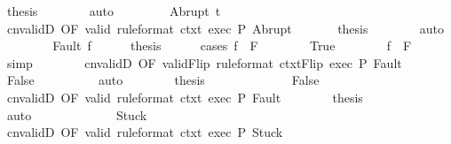 \begin{isabellebody}
\ {\isacharquery}thesis\isanewline
\ \ \ \ \ \ \isamarkupfalse%
\ auto\isanewline
\ \ \isamarkupfalse%
\isanewline
\ \ \ \ \isamarkupfalse%
\ {\isacharparenleft}Abrupt\ t{\isacharprime}{\isacharparenright}\isanewline
\ \ \ \ \isamarkupfalse%
\ cnvalidD\ {\isacharbrackleft}OF\ valid\ {\isacharbrackleft}rule{\isacharunderscore}format{\isacharbrackright}\ ctxt{\isacharprime}\ exec\ P{\isacharbrackright}\ Abrupt\ \isanewline
\ \ \ \ \isamarkupfalse%
\ {\isacharquery}thesis\isanewline
\ \ \ \ \ \ \isamarkupfalse%
\ auto\isanewline
\ \ \isamarkupfalse%
\isanewline
\ \ \ \ \isamarkupfalse%
\ {\isacharparenleft}Fault\ f{\isacharparenright}\isanewline
\ \ \ \ \isamarkupfalse%
\ {\isacharquery}thesis\isanewline
\ \ \ \ \isamarkupfalse%
\ {\isacharparenleft}cases\ {\isachardoublequoteopen}f\ {\isasymin}\ F{\isachardoublequoteclose}{\isacharparenright}\isanewline
\ \ \ \ \ \ \isamarkupfalse%
\ True\isanewline
\ \ \ \ \ \ \isamarkupfalse%
\ {\isachardoublequoteopen}f\ {\isasymnotin}\ {\isacharminus}F{\isachardoublequoteclose}\ \isamarkupfalse%
\ simp\isanewline
\ \ \ \ \ \ \isamarkupfalse%
\ cnvalidD\ {\isacharbrackleft}OF\ validFlip\ {\isacharbrackleft}rule{\isacharunderscore}format{\isacharbrackright}\ ctxtFlip\ exec\ P{\isacharbrackright}\ Fault\isanewline
\ \ \ \ \ \ \isamarkupfalse%
\ False\isanewline
\ \ \ \ \ \ \ \ \isamarkupfalse%
\ auto\isanewline
\ \ \ \ \ \ \isamarkupfalse%
\ {\isacharquery}thesis\ \isacommand{{\isachardot}{\isachardot}}\isamarkupfalse%
\isanewline
\ \ \ \ \isamarkupfalse%
\isanewline
\ \ \ \ \ \ \isamarkupfalse%
\ False\isanewline
\ \ \ \ \ \ \isamarkupfalse%
\ cnvalidD\ {\isacharbrackleft}OF\ valid\ {\isacharbrackleft}rule{\isacharunderscore}format{\isacharbrackright}\ ctxt{\isacharprime}\ exec\ P{\isacharbrackright}\ Fault\isanewline
\ \ \ \ \ \ \isamarkupfalse%
\ {\isacharquery}thesis\isanewline
\ \ \ \ \ \ \ \ \isamarkupfalse%
\ auto\isanewline
\ \ \ \ \isamarkupfalse%
\isanewline
\ \ \isamarkupfalse%
\isanewline
\ \ \ \ \isamarkupfalse%
\ Stuck\isanewline
\ \ \ \ \isamarkupfalse%
\ cnvalidD\ {\isacharbrackleft}OF\ valid\ {\isacharbrackleft}rule{\isacharunderscore}format{\isacharbrackright}\ ctxt{\isacharprime}\ exec\ P{\isacharbrackright}\ Stuck\isanewline

\end{isabellebody}
